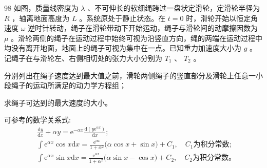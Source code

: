 \begin{problem}[第35届全国中学生物理竞赛决赛][滑轮与软绳动力学]{98}
    如图，质量线密度为 $\lambda$ 、不可伸长的软细绳跨过一盘状定滑轮，定滑轮半径为 $R$ ，轴离地面高度为 $L$ 。系统原处于静止状态。在 $t = 0$ 时，滑轮开始以恒定角速度 $\omega$ 逆时针转动，绳子在滑轮带动下开始运动，绳子与滑轮间的动摩擦因数为 $\mu$ 。滑轮两侧的绳子在运动过程中始终可视为沿竖直方向，绳的两端在运动过程中均没有离开地面，地面上的绳子可视为集中在一点。已知重力加速度大小为 $g$ 。记绳子在与滑轮左、右侧相切处的张力大小分别为 $T_{1}$ 、 $T_{2}$ 。
    \begin{subproblem}
        分别列出在绳子速度达到最大值之前，滑轮两侧绳子的竖直部分及滑轮上任意一小段绳子的运动所满足的动力学方程组；
    \end{subproblem}
    \begin{subproblem}
        求绳子可达到的最大速度的大小。

        可参考的数学关系式:
        \begin{align*}
            & {\frac {\mathrm{d} y}{\mathrm{d} x} + \alpha   y = \mathrm{e} ^ {- \alpha x}   \frac {\mathrm{d} (y \mathrm{e} ^ {\alpha x})}{\mathrm{d} x};} \\
            & {\int \mathrm{e} ^ {\alpha x} \cos x \mathrm{d} x = \frac {\mathrm{e} ^ {\alpha x}}{1 + \alpha^ {2}} \big (\alpha \cos x + \sin x \big) + C _ {1}, \quad C _ {1} \text {为积分常数};} \\
            & {\int \mathrm{e} ^ {\alpha x} \sin x \mathrm{d} x = \frac {\mathrm{e} ^ {\alpha x}}{1 + \alpha^ {2}} \big (\alpha \sin x - \cos x \big) + C _ {2}, \quad C _ {2} \text {为积分常数。}}
        \end{align*}
    \end{subproblem}
\end{problem}